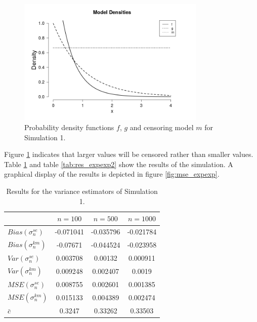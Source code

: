 \clearpage
\begin{figure}[h!]
	\begin{center}
		\includegraphics[width=0.8\textwidth]{./figures/exp_exp_dens}
	\end{center}
	\caption{Probability density functions $f$, $g$ and censoring model $m$ for Simulation 1.}
	\label{fig:dens_expexp}
\end{figure}
Figure \ref{fig:dens_expexp} indicates that larger values will be censored rather than smaller values. 
Table \ref{tab:res_expexp1} and table \ref{tab:res_expexp2} show the results of the simulation. A graphical display of the results is depicted in figure \ref{fig:mse_expexp}.
\begin{table}[h!]
	\begin{center}
		\begin{tabular}{| l || c | c | c |}
		\hline
		&       $n=100$   &    $n=500$    &    $n=1000$\\
		\hline
		\hline
		$Bias(\sigma_n^{se})$ & -0.071041 & -0.035796 & -0.021784\\
		$Bias(\sigma_n^{km})$ & -0.07671 & -0.044524 & -0.023958\\
		\hline
		$Var(\sigma_n^{se})$ & 0.003708 & 0.00132 & 0.000911\\
		$Var(\sigma_n^{km})$ & 0.009248 & 0.002407 & 0.0019\\
		\hline
		$MSE(\sigma_n^{se})$ & 0.008755 & 0.002601 & 0.001385\\
		$MSE(\sigma_n^{km})$  & 0.015133 & 0.004389 & 0.002474\\
		\hline
		\hline
		$\bar c$  & 0.3247 & 0.33262 & 0.33503\\
		\hline
		\end{tabular}
	\end{center}
	\caption{Results for the variance estimators of Simulation 1.}
	\label{tab:res_expexp1}
\end{table}
